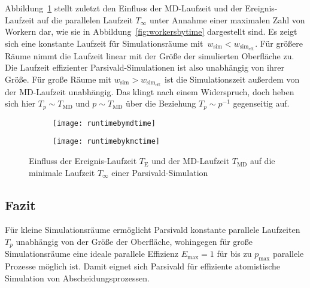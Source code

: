 Abbildung~\ref{fig:runtimebytime} stellt zuletzt den Einfluss der MD-Laufzeit und der Ereignis-Laufzeit auf die parallelen Laufzeit $T_\infty$ unter Annahme einer maximalen Zahl von Workern dar, wie sie in Abbildung~\ref{fig:workersbytime} dargestellt sind.
Es zeigt sich eine konstante Laufzeit für Simulationsräume mit~$w_\text{sim} < w_{\text{sim}_\text{eff.}}$.
Für größere Räume nimmt die Laufzeit linear mit der Größe der simulierten Oberfläche zu.
Die Laufzeit effizienter Parsivald-Simulationen ist also unabhängig von ihrer Größe.
Für große Räume mit $w_\text{sim} > w_{\text{sim}_\text{eff.}}$ ist die Simulationszeit außerdem von der MD-Laufzeit unabhängig.
Das klingt nach einem Widerspruch, doch heben sich hier $T_p \sim T_\text{MD}$ und $p \sim T_\text{MD}$ über die Beziehung $T_p \sim p^{-1}$ gegenseitig auf.

\begin{figure}[p]

  \captionsetup[subfigure]{singlelinecheck=false}
  \def\subfigwidth{7cm}
  \begin{subfigure}[t]{\subfigwidth}
    \texttt{[image: runtimebymdtime]}
  \end{subfigure}
  \hfill
  \begin{subfigure}[t]{\subfigwidth}
    \texttt{[image: runtimebykmctime]}
  \end{subfigure}

  \caption{Einfluss der Ereignis-Laufzeit $T_\text{E}$ und der MD-Laufzeit $T_\text{MD}$ auf die minimale Laufzeit $T_\infty$ einer Parsivald-Simulation}
  \label{fig:runtimebytime}

\end{figure}

\subsection{Fazit}

Für kleine Simulationsräume ermöglicht Parsivald konstante parallele Laufzeiten $T_p$ unabhängig von der Größe der Oberfläche, wohingegen für große Simulationsräume eine ideale parallele Effizienz $E_\text{max} = 1$ für bis zu $p_\text{max}$ parallele Prozesse möglich ist.
Damit eignet sich Parsivald für effiziente atomistische Simulation von Abscheidungsprozessen.


